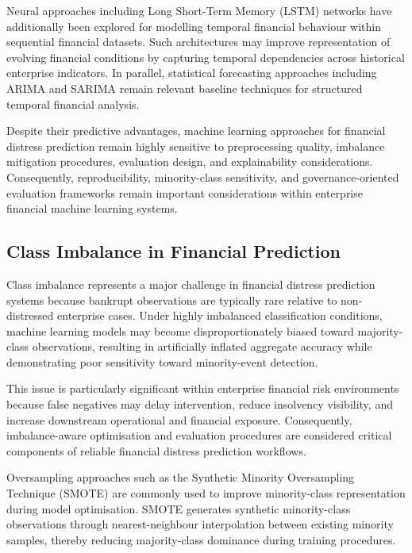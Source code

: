 \documentclass{article}
\begin{document}
Neural approaches including Long Short-Term Memory (LSTM) networks have additionally been explored for modelling temporal financial behaviour within sequential financial datasets. Such architectures may improve representation of evolving financial conditions by capturing temporal dependencies across historical enterprise indicators. In parallel, statistical forecasting approaches including ARIMA and SARIMA remain relevant baseline techniques for structured temporal financial analysis.

Despite their predictive advantages, machine learning approaches for financial distress prediction remain highly sensitive to preprocessing quality, imbalance mitigation procedures, evaluation design, and explainability considerations. Consequently, reproducibility, minority-class sensitivity, and governance-oriented evaluation frameworks remain important considerations within enterprise financial machine learning systems.

\subsection{Class Imbalance in Financial Prediction}

Class imbalance represents a major challenge in financial distress prediction systems because bankrupt observations are typically rare relative to non-distressed enterprise cases. Under highly imbalanced classification conditions, machine learning models may become disproportionately biased toward majority-class observations, resulting in artificially inflated aggregate accuracy while demonstrating poor sensitivity toward minority-event detection.

This issue is particularly significant within enterprise financial risk environments because false negatives may delay intervention, reduce insolvency visibility, and increase downstream operational and financial exposure. Consequently, imbalance-aware optimisation and evaluation procedures are considered critical components of reliable financial distress prediction workflows.

Oversampling approaches such as the Synthetic Minority Oversampling Technique (SMOTE) \cite{chawla2002smote} are commonly used to improve minority-class representation during model optimisation. SMOTE generates synthetic minority-class observations through nearest-neighbour interpolation between existing minority samples, thereby reducing majority-class dominance during training procedures.
\end{document}
